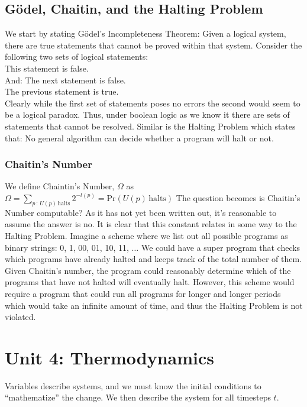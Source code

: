 \documentclass[11pt]{article}
\theoremstyle{definition}
\begin{document}
\subsection{G\"odel, Chaitin, and the Halting Problem}
We start by stating G\"odel's Incompleteness Theorem: 
\theorem Given a logical system, there are true statements that cannot be proved within that system. 
Consider the following two sets of logical statements:\\
This statement is false.\\
And:
The next statement is false.\\
The previous statement is true.\\

Clearly while the first set of statements poses no errors the second would seem to be a logical paradox. Thus, under boolean logic as we know it there are sets of statements that cannot be resolved. 
Similar is the Halting Problem which states that: 
\theorem No general algorithm can decide whether a program will halt or not.
\subsubsection {Chaitin's Number}
We define Chaintin's Number, $\Omega$ as
 $\displaystyle \Omega = \sum_{p \, : \, U(p) \, \mathrm{halts}} 2^{-l(p)} = \mathrm{Pr}(U(p) \, \mathrm{halts})$
The question becomes is Chaitin's Number computable? As it has not yet been written out, it's reasonable to assume the answer is no. It is clear that this constant relates in some way to the Halting Problem. Imagine a scheme where we list out all possible programs as binary strings: 0, 1, 00, 01, 10, 11, $\dots$
We could have a super program that checks which programs have already halted and keeps track of the total number of them. Given Chaitin's number, the program could reasonably determine which of the programs that have not halted will eventually halt. However, this scheme would require a program that could run all programs for longer and longer periods which would take an infinite amount of time, and thus the Halting Problem is not violated. 
\section{Unit 4: Thermodynamics}
Variables describe systems, and we must know the initial conditions to ``mathematize'' the change. We then describe the system for all timesteps $t$. 
\end{document}
